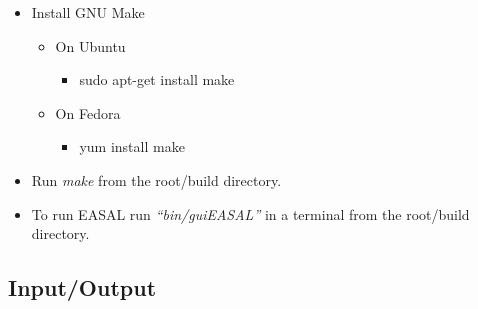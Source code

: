 \documentclass[10pt]{article}
\begin{document}
\begin{itemize}
\begin{itemize}
	   \end{itemize}
	 \item Install GNU Make
	   \begin{itemize}
	   	   \item On Ubuntu 
	   	   \begin{itemize}
			\item sudo apt-get install make
		   \end{itemize}	
		   \item On Fedora
		   \begin{itemize}
			\item yum install make
\end{itemize}
		   \end{itemize}
	 \item Run \emph{make} from the root/build directory.
	 \item To run EASAL run \emph{``bin/guiEASAL''} in a terminal from the root/build directory.
\end{itemize}%





\subsection{Input/Output}
\label{sec:part2io}
\end{document}
